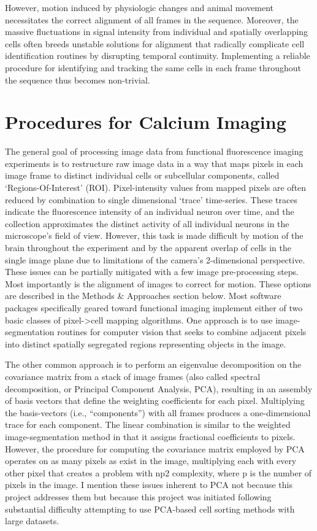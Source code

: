 However, motion induced by physiologic changes and animal movement necessitates the correct alignment of all frames in the sequence.
Moreover, the massive fluctuations in signal intensity from individual and spatially overlapping cells often breeds unstable solutions for alignment that radically complicate cell identification routines by disrupting temporal continuity.
Implementing a reliable procedure for identifying and tracking the same cells in each frame throughout the sequence thus becomes non-trivial.

\section{Procedures for Calcium Imaging}\label{sec:procedures-for-calcium-imaging}

The general goal of processing image data from functional fluorescence imaging experiments is to restructure raw image data in a way that maps pixels in each image frame to distinct individual cells or subcellular components, called `Regions-Of-Interest' (ROI).
Pixel-intensity values from mapped pixels are often reduced by combination to single dimensional `trace' time-series.
These traces indicate the fluorescence intensity of an individual neuron over time, and the collection approximates the distinct activity of all individual neurons in the microscope's field of view.
However, this task is made difficult by motion of the brain throughout the experiment and by the apparent overlap of cells in the single image plane due to limitations of the camera's 2-dimensional perspective.
These issues can be partially mitigated with a few image pre-processing steps.
Most importantly is the alignment of images to correct for motion.
These options are described in the Methods \& Approaches section below.
Most software packages specifically geared toward functional imaging implement either of two basic classes of pixel-\textgreater{}cell mapping algorithms.
One approach is to use image-segmentation routines for computer vision that seeks to combine adjacent pixels into distinct spatially segregated regions representing objects in the image.

The other common approach is to perform an eigenvalue decomposition on the covariance matrix from a stack of image frames (also called spectral decomposition, or Principal Component Analysis, PCA), resulting in an assembly of basis vectors that define the weighting coefficients for each pixel.
Multiplying the basis-vectors (i.e., ``components'') with all frames produces a one-dimensional trace for each component.
The linear combination is similar to the weighted image-segmentation method in that it assigns fractional coefficients to pixels.
However, the procedure for computing the covariance matrix employed by PCA operates on as many pixels as exist in the image, multiplying each with every other pixel that creates a problem with np2 complexity, where p is the number of pixels in the image.
I mention these issues inherent to PCA not because this project addresses them but because this project was initiated following substantial difficulty attempting to use PCA-based cell sorting methods with large datasets.

